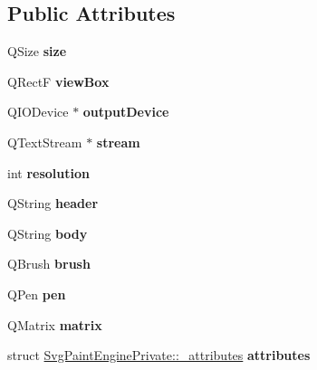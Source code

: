 \subsection*{Public Attributes}
\begin{DoxyCompactItemize}
\item 
\mbox{\label{class_svg_paint_engine_private_a0c6f2d37aa784afc1471e2243eefa5ac}} 
Q\+Size {\bfseries size}
\item 
\mbox{\label{class_svg_paint_engine_private_aeeea5567e98ef63195f57c82edbc8593}} 
Q\+RectF {\bfseries view\+Box}
\item 
\mbox{\label{class_svg_paint_engine_private_aa60e992bb983eaeaf54c82ac4f154601}} 
Q\+I\+O\+Device $\ast$ {\bfseries output\+Device}
\item 
\mbox{\label{class_svg_paint_engine_private_a5efbf18c4267d56ce92f7e4551d94ff7}} 
Q\+Text\+Stream $\ast$ {\bfseries stream}
\item 
\mbox{\label{class_svg_paint_engine_private_a0661404988e8efdbe161aa25bbaf7065}} 
int {\bfseries resolution}
\item 
\mbox{\label{class_svg_paint_engine_private_ae4a0974fc6c53daf9c5446628041d984}} 
Q\+String {\bfseries header}
\item 
\mbox{\label{class_svg_paint_engine_private_a3a225db0714a90a3a815ccfc9d8730be}} 
Q\+String {\bfseries body}
\item 
\mbox{\label{class_svg_paint_engine_private_ad73e112733bb52b714873361996950fe}} 
Q\+Brush {\bfseries brush}
\item 
\mbox{\label{class_svg_paint_engine_private_a1217fc69bd6f87c544a3ff074b35bf6e}} 
Q\+Pen {\bfseries pen}
\item 
\mbox{\label{class_svg_paint_engine_private_ab35445b37f66a41c3e653ced0bef491b}} 
Q\+Matrix {\bfseries matrix}
\item 
\mbox{\label{class_svg_paint_engine_private_a0aa6fddeacb9d96d1160a66824c20aa4}} 
struct \hyperlink{struct_svg_paint_engine_private_1_1__attributes}{Svg\+Paint\+Engine\+Private\+::\+\_\+attributes} {\bfseries attributes}
\end{DoxyCompactItemize}
